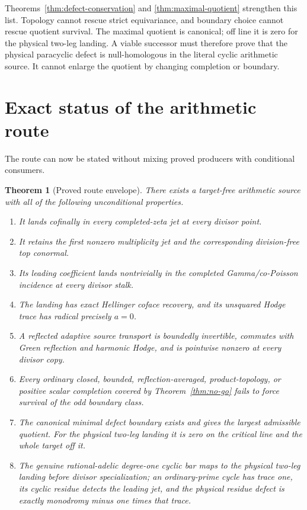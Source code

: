 \documentclass[11pt]{article}
\newtheorem{theorem}{Theorem}[section]
\theoremstyle{definition}
\theoremstyle{remark}
\begin{document}
Theorems~\ref{thm:defect-conservation} and
\ref{thm:maximal-quotient} strengthen this list.  Topology cannot rescue
strict equivariance, and boundary choice cannot rescue quotient survival.
The maximal quotient is canonical; off line it is zero for the physical
two-leg landing.  A viable successor must therefore prove that the physical
paracyclic defect is null-homologous in the literal cyclic arithmetic source.
It cannot enlarge the quotient by changing completion or boundary.

\section{Exact status of the arithmetic route}

The route can now be stated without mixing proved producers with conditional
consumers.

\begin{theorem}[Proved route envelope]
\label{thm:route-envelope}
There exists a target-free arithmetic source with all of the following
unconditional properties.
\begin{enumerate}[label=\textup{(\roman*)}]
\item It lands cofinally in every completed-zeta jet at every divisor point.
\item It retains the first nonzero multiplicity jet and the corresponding
      division-free top conormal.
\item Its leading coefficient lands nontrivially in the completed
      Gamma/co-Poisson incidence at every divisor stalk.
\item The landing has exact Hellinger coface recovery, and its unsquared
      Hodge trace has radical precisely \(a=0\).
\item A reflected adaptive source transport is boundedly invertible,
      commutes with Green reflection and harmonic Hodge, and is pointwise
      nonzero at every divisor copy.
\item Every ordinary closed, bounded, reflection-averaged, product-topology,
      or positive scalar completion covered by
      Theorem~\ref{thm:no-go} fails to force survival of the odd boundary
      class.
\item The canonical minimal defect boundary exists and gives the largest
      admissible quotient.  For the physical two-leg landing it is zero on
      the critical line and the whole target off it.
\item The genuine rational-adelic degree-one cyclic bar maps to the physical
      two-leg landing before divisor specialization; an ordinary-prime cycle
      has trace one, its cyclic residue detects the leading jet, and the
      physical residue defect is exactly monodromy minus one times that
      trace.
\end{enumerate}
\end{theorem}
\end{document}
